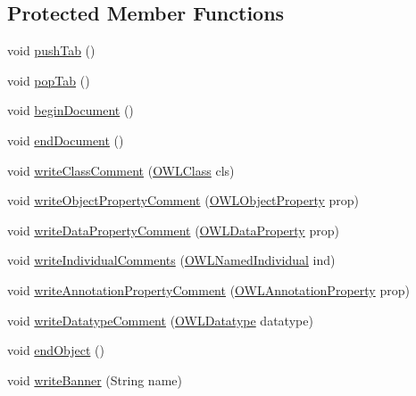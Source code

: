 \subsection*{Protected Member Functions}
\begin{DoxyCompactItemize}
\item 
void \hyperlink{classorg_1_1coode_1_1owlapi_1_1turtle_1_1_turtle_renderer_a419a32b83602296b8f962fc2ce66b5a7}{push\-Tab} ()
\item 
void \hyperlink{classorg_1_1coode_1_1owlapi_1_1turtle_1_1_turtle_renderer_acf4053480644c1a197a99aa56c1a0fc5}{pop\-Tab} ()
\item 
void \hyperlink{classorg_1_1coode_1_1owlapi_1_1turtle_1_1_turtle_renderer_a062fc38936c28abc1c2ebb4622b2f0bd}{begin\-Document} ()
\item 
void \hyperlink{classorg_1_1coode_1_1owlapi_1_1turtle_1_1_turtle_renderer_a03eb0ad8c289a9e1d3b7efa97081ff2f}{end\-Document} ()
\item 
void \hyperlink{classorg_1_1coode_1_1owlapi_1_1turtle_1_1_turtle_renderer_af3ef28a6d27a60abfb93d510968ee3fa}{write\-Class\-Comment} (\hyperlink{interfaceorg_1_1semanticweb_1_1owlapi_1_1model_1_1_o_w_l_class}{O\-W\-L\-Class} cls)
\item 
void \hyperlink{classorg_1_1coode_1_1owlapi_1_1turtle_1_1_turtle_renderer_a15d1ef33bb7207bc7473d4ed9a426552}{write\-Object\-Property\-Comment} (\hyperlink{interfaceorg_1_1semanticweb_1_1owlapi_1_1model_1_1_o_w_l_object_property}{O\-W\-L\-Object\-Property} prop)
\item 
void \hyperlink{classorg_1_1coode_1_1owlapi_1_1turtle_1_1_turtle_renderer_ac3e19d7007aaec37d2bc7cc12aae7e57}{write\-Data\-Property\-Comment} (\hyperlink{interfaceorg_1_1semanticweb_1_1owlapi_1_1model_1_1_o_w_l_data_property}{O\-W\-L\-Data\-Property} prop)
\item 
void \hyperlink{classorg_1_1coode_1_1owlapi_1_1turtle_1_1_turtle_renderer_af381849fd5dca8b70929bb7c55a98163}{write\-Individual\-Comments} (\hyperlink{interfaceorg_1_1semanticweb_1_1owlapi_1_1model_1_1_o_w_l_named_individual}{O\-W\-L\-Named\-Individual} ind)
\item 
void \hyperlink{classorg_1_1coode_1_1owlapi_1_1turtle_1_1_turtle_renderer_aaa1c32dbf0a3e83e724ece74b18677c9}{write\-Annotation\-Property\-Comment} (\hyperlink{interfaceorg_1_1semanticweb_1_1owlapi_1_1model_1_1_o_w_l_annotation_property}{O\-W\-L\-Annotation\-Property} prop)
\item 
void \hyperlink{classorg_1_1coode_1_1owlapi_1_1turtle_1_1_turtle_renderer_a0bc9d23e8fe3404982fc222ccfac1a67}{write\-Datatype\-Comment} (\hyperlink{interfaceorg_1_1semanticweb_1_1owlapi_1_1model_1_1_o_w_l_datatype}{O\-W\-L\-Datatype} datatype)
\item 
void \hyperlink{classorg_1_1coode_1_1owlapi_1_1turtle_1_1_turtle_renderer_aef728dde34e9c27e8b261d2700d3cd9b}{end\-Object} ()
\item 
void \hyperlink{classorg_1_1coode_1_1owlapi_1_1turtle_1_1_turtle_renderer_a93e5d8e40a025334b16202bbc4e6cd15}{write\-Banner} (String name)
\end{DoxyCompactItemize}
